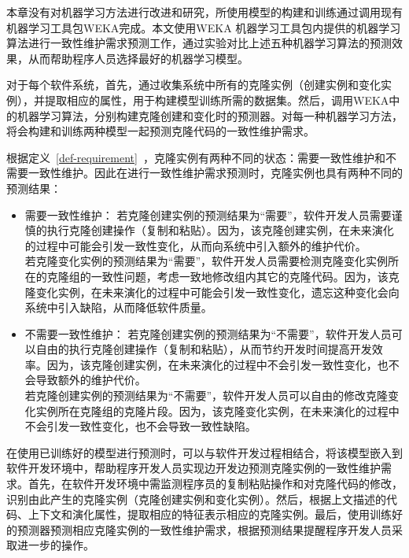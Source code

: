 本章没有对机器学习方法进行改进和研究，所使用模型的构建和训练通过调用现有机器学习工具包WEKA完成。本文使用WEKA 机器学习工具包内提供的机器学习算法进行一致性维护需求预测工作，通过实验对比上述五种机器学习算法的预测效果，从而帮助程序人员选择最好的机器学习模型。

对于每个软件系统，首先，通过收集系统中所有的克隆实例（创建实例和变化实例），并提取相应的属性，用于构建模型训练所需的数据集。然后，调用WEKA中的机器学习算法，分别构建克隆创建和变化时的预测器。对每一种机器学习方法，将会构建和训练两种模型一起预测克隆代码的一致性维护需求。

根据定义~\ref{def-requirement}~，克隆实例有两种不同的状态：需要一致性维护和不需要一致性维护。因此在进行一致性维护需求预测时，克隆实例也具有两种不同的预测结果：
\begin{itemize}
\item 
需要一致性维护：
若克隆创建实例的预测结果为“需要”，软件开发人员需要谨慎的执行克隆创建操作（复制和粘贴）。因为，该克隆创建实例，在未来演化的过程中可能会引发一致性变化，从而向系统中引入额外的维护代价。\\
若克隆变化实例的预测结果为“需要”，软件开发人员需要检测克隆变化实例所在的克隆组的一致性问题，考虑一致地修改组内其它的克隆代码。因为，该克隆变化实例，在未来演化的过程中可能会引发一致性变化，遗忘这种变化会向系统中引入缺陷，从而降低软件质量。
\item
不需要一致性维护：
若克隆创建实例的预测结果为“不需要”，软件开发人员可以自由的执行克隆创建操作（复制和粘贴），从而节约开发时间提高开发效率。因为，该克隆创建实例，在未来演化的过程中不会引发一致性变化，也不会导致额外的维护代价。\\
若克隆创建实例的预测结果为“不需要”，软件开发人员可以自由的修改克隆变化实例所在克隆组的克隆片段。因为，该克隆变化实例，在未来演化的过程中不会引发一致性变化，也不会导致一致性缺陷。
\end{itemize}


在使用已训练好的模型进行预测时，可以与软件开发过程相结合，将该模型嵌入到软件开发环境中，帮助程序开发人员实现边开发边预测克隆实例的一致性维护需求。首先，在软件开发环境中需监测程序员的复制粘贴操作和对克隆代码的修改，识别由此产生的克隆实例（克隆创建实例和变化实例）。然后，根据上文描述的代码、上下文和演化属性，提取相应的特征表示相应的克隆实例。最后，使用训练好的预测器预测相应克隆实例的一致性维护需求，根据预测结果提醒程序开发人员采取进一步的操作。






